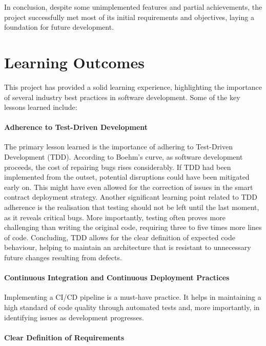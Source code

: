 In conclusion, despite some unimplemented features and partial achievements, the project successfully met most of its initial requirements and objectives, laying a foundation for future development.

\section{Learning Outcomes}

This project has provided a solid learning experience, highlighting the importance of several industry best practices in software development. Some of the key lessons learned include:

\paragraph{Adherence to Test-Driven Development}

The primary lesson learned is the importance of adhering to Test-Driven Development (TDD). According to Boehm's curve, as software development proceeds, the cost of repairing bugs rises considerably. If TDD had been implemented from the outset, potential disruptions could have been mitigated early on. This might have even allowed for the correction of issues in the smart contract deployment strategy. Another significant learning point related to TDD adherence is the realisation that testing should not be left until the last moment, as it reveals critical bugs. More importantly, testing often proves more challenging than writing the original code, requiring three to five times more lines of code. Concluding, TDD allows for the clear definition of expected code behaviour, helping to maintain an architecture that is resistant to unnecessary future changes resulting from defects.

\paragraph{Continuous Integration and Continuous Deployment Practices}

Implementing a CI/CD pipeline is a must-have practice. It helps in maintaining a high standard of code quality through automated tests and, more importantly, in identifying issues as development progresses. 

\paragraph{Clear Definition of Requirements}


